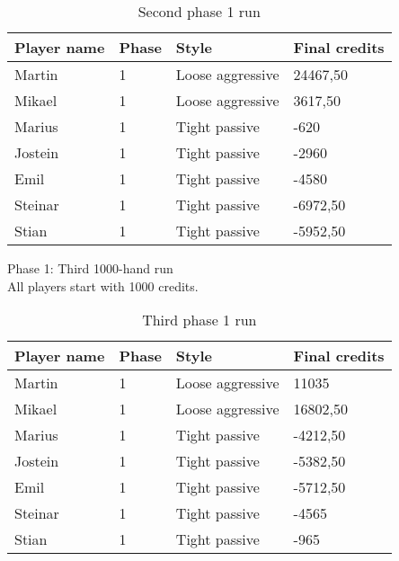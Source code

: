 \documentclass[a4paper, 12pt]{article}
\begin{document}
\begin{table}[H]
	\begin{center}
		\begin{tabular}{|l|l|l| p{6cm} |}
		\hline
		\textbf{Player name} & \textbf{Phase} & \textbf{Style} & \textbf{Final credits} \\
		\hline
		Martin & 1 & Loose aggressive & 24467,50 \\
		\hline
		Mikael & 1 & Loose aggressive & 3617,50 \\
		\hline
		Marius & 1 & Tight passive & -620 \\
		\hline
		Jostein & 1 & Tight passive & -2960 \\
		\hline
		Emil & 1 & Tight passive & -4580 \\
		\hline
		Steinar & 1 & Tight passive & -6972,50 \\
		\hline
		Stian & 1 & Tight passive & -5952,50 \\
		\hline
		\end{tabular}
	\end{center}
	\caption{Second phase 1 run}
\end{table}
\newpage
\begin{center}
	{ \Large Phase 1: Third 1000-hand run } \\
	All players start with 1000 credits.
\end{center}

\begin{table}[H]
	\begin{center}
		\begin{tabular}{|l|l|l| p{6cm} |}
		\hline
		\textbf{Player name} & \textbf{Phase} & \textbf{Style} & \textbf{Final credits} \\
		\hline
		Martin & 1 & Loose aggressive & 11035 \\
		\hline
		Mikael & 1 & Loose aggressive & 16802,50 \\
		\hline
		Marius & 1 & Tight passive & -4212,50 \\
		\hline
		Jostein & 1 & Tight passive & -5382,50 \\
		\hline
		Emil & 1 & Tight passive & -5712,50 \\
		\hline
		Steinar & 1 & Tight passive & -4565 \\
		\hline
		Stian & 1 & Tight passive & -965 \\
		\hline
		\end{tabular}
	\end{center}
	\caption{Third phase 1 run}
\end{table}
\end{document}
